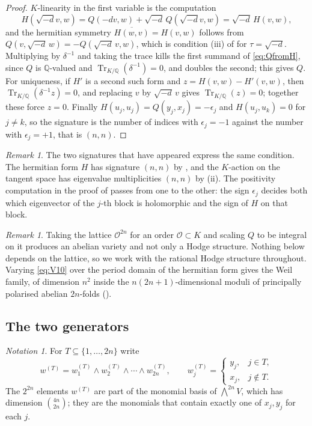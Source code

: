 \documentclass[11pt,reqno]{amsart}
\theoremstyle{plain}
\theoremstyle{definition}
\theoremstyle{remark}
\newtheorem{remark}[theorem]{Remark}
\newtheorem{notation}[theorem]{Notation}
\newcommand{\QQ}{\mathbb{Q}}
\newcommand{\cO}{\mathcal{O}}
\DeclareMathOperator{\Tr}{Tr}
\begin{document}
\begin{proof}
$K$-linearity in the first variable is the computation
\[
  H(\sqrt{-d}v,w)=Q(-dv,w)+\sqrt{-d}\,Q(\sqrt{-d}v,w)=\sqrt{-d}\,H(v,w),
\]
and the hermitian symmetry $\overline{H(w,v)}=H(v,w)$ follows from
$Q(v,\sqrt{-d}\,w)=-Q(\sqrt{-d}\,v,w)$, which is condition (iii) of
 for $\tau=\sqrt{-d}$. Multiplying by $\delta^{-1}$ and
taking the trace kills the first summand of \eqref{eq:QfromH}, since $Q$ is
$\QQ$-valued and $\Tr_{K/\QQ}(\delta^{-1})=0$, and doubles the second; this
gives $Q$. For uniqueness, if $H'$ is a second such form and
$z=H(v,w)-H'(v,w)$, then $\Tr_{K/\QQ}(\delta^{-1}z)=0$, and replacing $v$ by
$\sqrt{-d}\,v$ gives $\Tr_{K/\QQ}(z)=0$; together these force $z=0$. Finally
$H(u_{j},u_{j})=Q(y_{j},x_{j})=-\epsilon_{j}$ and
$H(u_{j},u_{k})=0$ for $j\ne k$, so the signature is the number of indices with
$\epsilon_{j}=-1$ against the number with $\epsilon_{j}=+1$, that is $(n,n)$.
\end{proof}

\begin{remark}\label{rem:twosignatures}
The two signatures that have appeared express the same condition. The hermitian
form $H$ has signature $(n,n)$ by , and the $K$-action on
the tangent space has eigenvalue multiplicities $(n,n)$ by
(ii). The positivity computation in the proof of
 passes from one to the other: the sign $\epsilon_{j}$
decides both which eigenvector of the $j$-th block is holomorphic and the sign
of $H$ on that block.
\end{remark}

\begin{remark}\label{rem:lattice}
Taking the lattice $\cO^{2n}$ for an order $\cO\subset K$ and scaling $Q$ to be
integral on it produces an abelian variety and not only a Hodge structure.
Nothing below depends on the lattice, so we work with the rational Hodge
structure throughout. Varying \eqref{eq:V10} over the period domain of the
hermitian form gives the Weil family, of dimension $n^{2}$ inside the
$n(2n+1)$-dimensional moduli of principally polarised abelian $2n$-folds
().
\end{remark}

\subsection{The two generators}

\begin{notation}\label{not:wT}
For $T\subseteq\{1,\dots,2n\}$ write
\[
  w^{(T)}=w^{(T)}_{1}\wedge w^{(T)}_{2}\wedge\cdots\wedge w^{(T)}_{2n},
  \qquad
  w^{(T)}_{j}=
  \begin{cases}
    y_{j}, & j\in T,\\
    x_{j}, & j\notin T .
  \end{cases}
\]
The $2^{2n}$ elements $w^{(T)}$ are part of the monomial basis of
$\bigwedge^{2n}V$, which has dimension $\binom{4n}{2n}$; they are the
monomials that contain exactly one of $x_{j},y_{j}$ for each $j$.
\end{notation}
\end{document}
